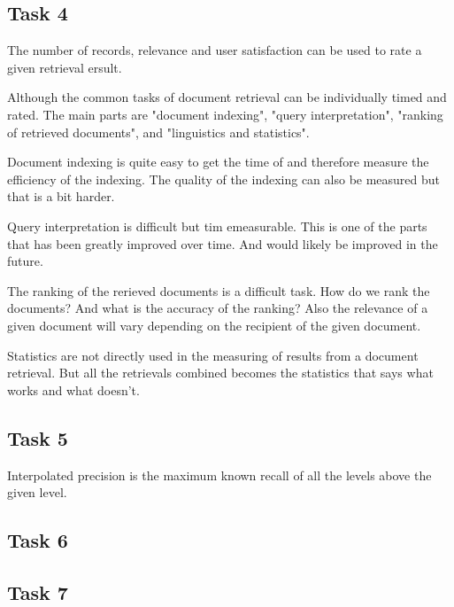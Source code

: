 \documentclass[12pt, a4paper]{article}
\begin{document}
\subsection{Task 4}

The number of records, relevance and user satisfaction can be used to rate a given retrieval ersult. 

Although the common tasks of document retrieval can be individually timed and rated.
The main parts are "document indexing", "query interpretation", "ranking of retrieved documents", and "linguistics and statistics". 

Document indexing is quite easy to get the time of and therefore measure the efficiency of the indexing. 
The quality of the indexing can also be measured but that is a bit harder. 

Query interpretation is difficult but tim emeasurable. This is one of the parts that has been greatly improved over time. And would likely be improved in the future. 

The ranking of the rerieved documents is a difficult task. How do we rank the documents? And what is the accuracy of the ranking? Also the relevance of a given document will vary depending on the recipient of the given document. 

Statistics are not directly used in the measuring of results from a document retrieval. But all the retrievals combined becomes the statistics that says what works and what doesn't. 

\subsection{Task 5}
Interpolated precision is the maximum known recall of all the levels above the given level. 

\subsection{Task 6}

\subsection{Task 7}
\end{document}
